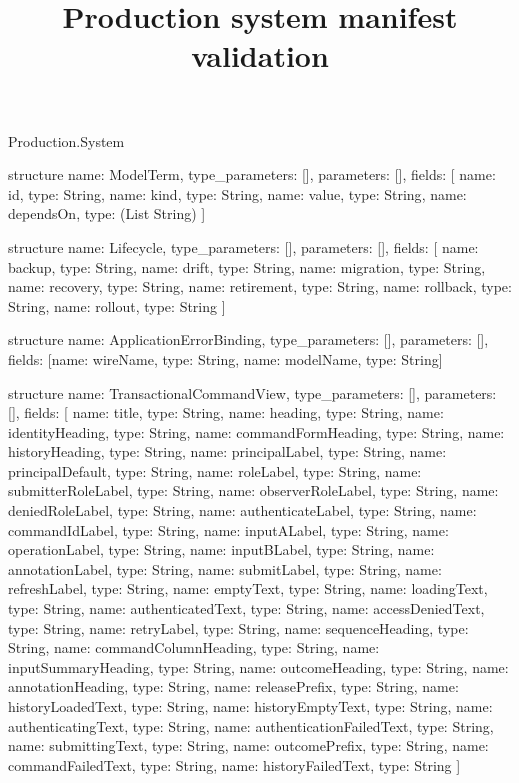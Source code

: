 \begin{lexlean}{Production.System}
\title{Production system manifest validation}
\begin{semanticmodule}
structure{
  name: ModelTerm,
  type_parameters: [],
  parameters: [],
  fields: [
    {name: id, type: String},
    {name: kind, type: String},
    {name: value, type: String},
    {name: dependsOn, type: (List String)}
  ]
}

structure{
  name: Lifecycle,
  type_parameters: [],
  parameters: [],
  fields: [
    {name: backup, type: String},
    {name: drift, type: String},
    {name: migration, type: String},
    {name: recovery, type: String},
    {name: retirement, type: String},
    {name: rollback, type: String},
    {name: rollout, type: String}
  ]
}

structure{
  name: ApplicationErrorBinding,
  type_parameters: [],
  parameters: [],
  fields: [{name: wireName, type: String}, {name: modelName, type: String}]
}

structure{
  name: TransactionalCommandView,
  type_parameters: [],
  parameters: [],
  fields: [
    {name: title, type: String},
    {name: heading, type: String},
    {name: identityHeading, type: String},
    {name: commandFormHeading, type: String},
    {name: historyHeading, type: String},
    {name: principalLabel, type: String},
    {name: principalDefault, type: String},
    {name: roleLabel, type: String},
    {name: submitterRoleLabel, type: String},
    {name: observerRoleLabel, type: String},
    {name: deniedRoleLabel, type: String},
    {name: authenticateLabel, type: String},
    {name: commandIdLabel, type: String},
    {name: inputALabel, type: String},
    {name: operationLabel, type: String},
    {name: inputBLabel, type: String},
    {name: annotationLabel, type: String},
    {name: submitLabel, type: String},
    {name: refreshLabel, type: String},
    {name: emptyText, type: String},
    {name: loadingText, type: String},
    {name: authenticatedText, type: String},
    {name: accessDeniedText, type: String},
    {name: retryLabel, type: String},
    {name: sequenceHeading, type: String},
    {name: commandColumnHeading, type: String},
    {name: inputSummaryHeading, type: String},
    {name: outcomeHeading, type: String},
    {name: annotationHeading, type: String},
    {name: releasePrefix, type: String},
    {name: historyLoadedText, type: String},
    {name: historyEmptyText, type: String},
    {name: authenticatingText, type: String},
    {name: authenticationFailedText, type: String},
    {name: submittingText, type: String},
    {name: outcomePrefix, type: String},
    {name: commandFailedText, type: String},
    {name: historyFailedText, type: String}
  ]
}


\end{semanticmodule}
\end{lexlean}

